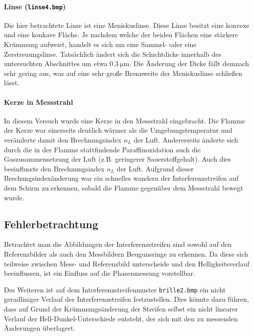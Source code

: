\paragraph{Linse (\texttt{linse4.bmp})}
Die hier betrachtete Linse ist eine Meniskuslinse. Diese Linse besitzt eine konvexe und eine konkave Fläche. Je nachdem welche der beiden Flächen eine stärkere Krümmung aufweist, handelt es sich um eine Sammel- oder eine Zerstreuungslinse. 
Tatsächlich ändert sich die Schichtdicke innerhalb des untersuchten Abschnittes um etwa $\SI{0.3}{\micro\meter}$. Die Änderung der Dicke fällt demnach sehr gering aus, was auf eine sehr große Brennweite der Meniskuslinse schließen lässt. 

\paragraph{Kerze in Messstrahl}
In diesem Versuch wurde eine Kerze in den Messstrahl eingebracht. Die Flamme der Kerze war einerseits deutlich wärmer als die Umgebungstemperatur und veränderte damit den Brechnungsindex $n_L$ der Luft. Andererseits änderte sich durch die in der Flamme stattfindende Paraffinoxidation auch die Gaszusammensetzung der Luft (z.B. geringerer Sauerstoffgehalt). Auch dies beeinflusste den Brechnungsindex $n_L$ der Luft. 
Aufgrund dieser Brechungsindexänderung war ein schnelles wandern der Interferenzstreifen auf dem Schirm zu erkennen, sobald die Flamme gegenüber dem Messstrahl bewegt wurde.

\subsection{Fehlerbetrachtung}
Betrachtet man die Abbildungen der Interferenzstreifen sind sowohl auf den Referenzbilder als auch den Messbildern Beugunsringe zu erkennen. Da diese sich teilweise zwischen Mess- und Referenzbild unterscheide und den Helligkeitsverlauf beeinflussen, ist ein Einfluss auf die Phasenmessung vorstellbar.

Des Weiteren ist auf dem Interferenzstreifenmuster \texttt{brille2.bmp} ein nicht geradliniger Verlauf der Interferenzstreifen festzustellen. Dies könnte dazu führen, dass auf Grund der Krümmungsänderung der Streifen selbst ein nicht linearer Verlauf der Hell-Dunkel-Unterschiede entsteht, der sich mit den zu messenden Änderungen überlagert.


